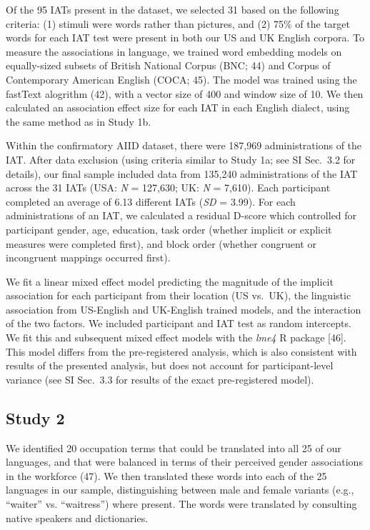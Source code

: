 \documentclass[9pt,twocolumn]{pnas-new}
\begin{document}
Of the 95 IATs present in the dataset, we selected 31 based on the following criteria: (1) stimuli were words rather than pictures, and (2) 75\% of the target words for each IAT test were present in both our US and UK English corpora. To measure the associations in language, we trained word embedding models on equally-sized subsets of British National Corpus (BNC; 44) and Corpus of Contemporary American English (COCA; 45). The model was trained using the fastText alogrithm (42), with a vector size of 400 and  window size of 10. We then calculated an association effect size for each IAT in each English dialect, using the same method as in Study 1b. 


Within the confirmatory AIID dataset, there were 187,969 administrations
of the IAT. After data exclusion (using criteria similar to Study 1a; see SI Sec.\ 3.2 for details), our final sample
included data from 135,240 administrations of the IAT across the 31 IATs (USA: \emph{N} = 127,630; UK: \emph{N} = 7,610). Each participant
completed an average of 6.13 different IATs (\emph{SD} = 3.99). For each administrations of an IAT, we calculated a residual D-score which controlled for participant gender, age, education, task order (whether implicit or explicit measures were completed first), and block order (whether congruent or incongruent mappings occurred first).

We fit a linear mixed effect model predicting the magnitude of the implicit association for each participant from their location (US vs.\ UK), the linguistic association from US-English and UK-English trained models, and the interaction of the two factors. We included participant and IAT test as random intercepts. We fit this and subsequent mixed effect models with the \emph{lme4} R package [46]. This model differs from the pre-registered analysis, which is also consistent with results of the presented analysis, but does not account for participant-level variance (see SI Sec.\ 3.3 for results of the exact pre-registered model).


\subsection*{Study 2}

We identified 20 occupation terms that could be translated into  all 25 of our languages, and that were balanced in terms of their perceived gender associations in the workforce (47). We
then translated these words into each of the 25 languages in our sample,
distinguishing between male and female variants (e.g., \enquote{waiter}
vs. \enquote{waitress}) where present. The words were translated by
consulting native speakers and dictionaries.
\end{document}
